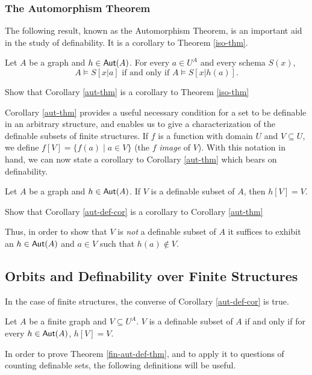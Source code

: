 \subsubsection*{The Automorphism Theorem}

The following result, known as the Automorphism Theorem, is an important aid in the study of definability. It is a corollary to Theorem \ref{iso-thm}.
\begin{corollary}\label{aut-thm}
Let $A$ be a graph and $h\in\mbox{$\mathsf{Aut}(A)$}$. For every $a\in U^A$ and every schema $S(x)$,
\[
A\models S[x|a]\mbox{ if and only if }A\models S[x|h(a)]. 
\]
\end{corollary}
\begin{aside}
    Show that Corollary \ref{aut-thm} is a corollary to Theorem \ref{iso-thm}
\end{aside}

Corollary \ref{aut-thm} provides a useful necessary condition for a set to be definable in an arbitrary structure, and enables us to give a characterization of the definable subsets of finite structures. 
If $f$ is a function with domain $U$ and $V\subseteq U$, we define $f[V]=\{f(a)\mid a\in V\}$ (the $f$ \emph{image} of $V$). With this notation in hand, we can now state a corollary to Corollary \ref{aut-thm} which bears on definability.
\begin{corollary}\label{aut-def-cor}
Let $A$ be a graph and $h\in\mbox{$\mathsf{Aut}(A)$}$. If $V$ is a definable subset of $A$, then $h[V]=V$.
\end{corollary}
\begin{aside}
    Show that Corollary \ref{aut-def-cor} is a corollary to Corollary \ref{aut-thm}
\end{aside}

Thus, in order to show that $V$ is \emph{not} a definable subset of $A$ it suffices to exhibit an $h\in\mbox{$\mathsf{Aut}(A)$}$ and $a\in V$ such that $h(a)\not\in V$. 
\subsection*{Orbits and Definability over Finite Structures}

In the case of finite structures, the converse of Corollary \ref{aut-def-cor} is true.
\begin{theorem}\label{fin-aut-def-thm}
Let $A$ be a finite graph and $V\subseteq U^A$. $V$ is a definable subset of $A$ if and only if for every $h\in\mbox{$\mathsf{Aut}(A)$}$, $h[V]=V$.
\end{theorem}
In order to prove Theorem \ref{fin-aut-def-thm}, and to apply it to questions of counting definable sets, the following definitions will be useful. 


